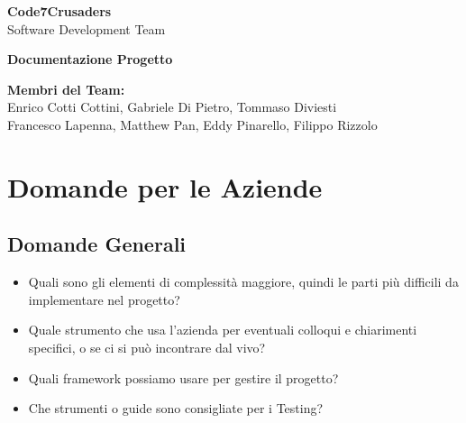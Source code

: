 \documentclass{article}
\begin{document}
\begin{titlepage}
    {\Huge \textbf{Code7Crusaders}}\\
    \vspace{0.5cm}
    {\Large Software Development Team}\\
    \vspace{2cm}
    
    {\large \textbf{Documentazione Progetto}}\\
    \vspace{5cm}

    \textbf{Membri del Team:}\\
    Enrico Cotti Cottini, Gabriele Di Pietro, Tommaso Diviesti \\
    Francesco Lapenna, Matthew Pan, Eddy Pinarello, Filippo Rizzolo \\
    \vspace{0.5cm}
    
    \vspace{1cm}
\end{titlepage}

\newpage
\tableofcontents
\newpage

\section{Domande per le Aziende}\label{sec:domande-aziende}
\subsection{Domande Generali}\label{subsec:domande-generali}
\begin{itemize}
    \item Quali sono gli elementi di complessità maggiore, quindi le parti più difficili da implementare nel progetto?
    \item Quale strumento che usa l’azienda per eventuali colloqui e chiarimenti specifici, o se ci si può incontrare dal vivo?
    \item Quali framework possiamo usare per gestire il progetto? 
    \item Che strumenti o guide sono consigliate per i Testing?
\end{itemize}
\end{document}
